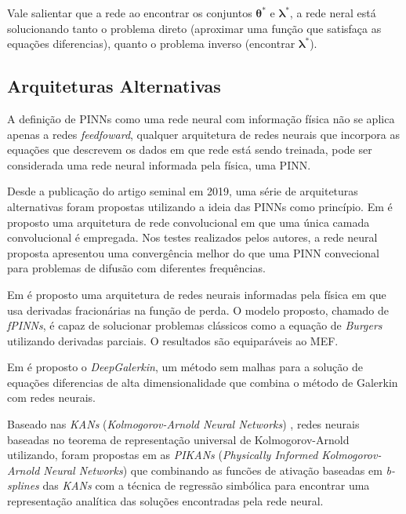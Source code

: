Vale salientar que a rede ao encontrar os conjuntos $\boldsymbol{\theta}^*$
e $\boldsymbol{\lambda}^*$, a rede neral está solucionando tanto o problema
direto (aproximar uma função que satisfaça as equações diferencias), quanto o 
problema inverso (encontrar $\boldsymbol{\lambda}^*$). 

\subsection{Arquiteturas Alternativas}

A definição de PINNs como uma rede neural com informação física não se aplica
apenas a redes \textit{feedfoward}, qualquer arquitetura de redes neurais
que incorpora as equações que descrevem os dados em que rede está sendo treinada, 
pode ser considerada uma rede neural informada pela física, uma PINN.

Desde a publicação do artigo seminal em 2019, uma série de arquiteturas 
alternativas foram propostas utilizando a ideia das PINNs como princípio.
Em \cite{shi-etal:24-convnet} é proposto uma arquitetura de rede convolucional
em que uma única camada convolucional é empregada. Nos testes realizados pelos
autores, a rede neural proposta apresentou uma convergência melhor do que uma 
PINN convecional para problemas de difusão com diferentes frequências. 

Em \cite{pang-etal:2019-fPINNs} é proposto uma arquitetura de redes neurais 
informadas pela física em que usa derivadas fracionárias na função de perda.
O modelo proposto, chamado de \textit{fPINNs}, é capaz de solucionar problemas 
clássicos como a equação de \textit{Burgers} utilizando derivadas parciais. 
O resultados são equiparáveis ao MEF.

Em \cite{sirignano-spiliopoulos:2018-deepgalerkin} é proposto o 
\textit{DeepGalerkin}, um método sem malhas para a solução de equações
diferencias de alta dimensionalidade que combina o método de Galerkin com
redes neurais. 

Baseado nas \textit{KANs} (\textit{Kolmogorov-Arnold Neural Networks})
\cite{liu-etal:2025-kans}, redes neurais baseadas no teorema de representação 
universal de Kolmogorov-Arnold utilizando, foram propostas em as 
\textit{PIKANs} (\textit{Physically Informed Kolmogorov-Arnold Neural Networks})
que combinando as funcões de ativação baseadas em \textit{b-splines} das
\textit{KANs} com a técnica de regressão simbólica para encontrar uma 
representação analítica das soluções encontradas pela rede neural.


